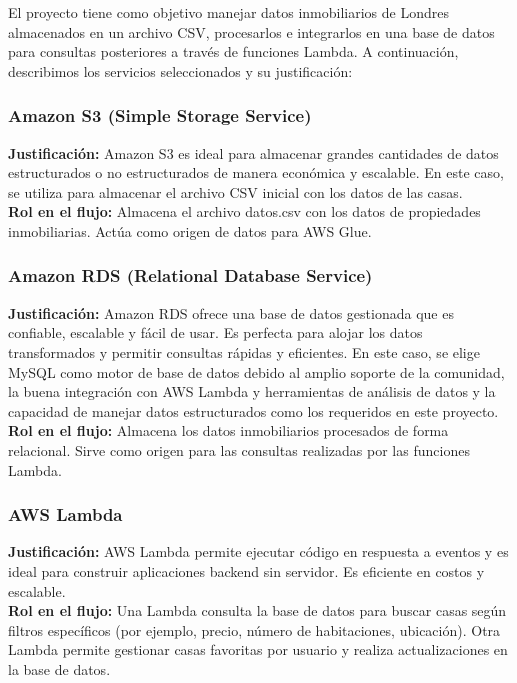 \documentclass{article}
\begin{document}
El proyecto tiene como objetivo manejar datos inmobiliarios de Londres almacenados en un archivo CSV, procesarlos e integrarlos en una base de datos para consultas posteriores a través de funciones Lambda. A continuación, describimos los servicios seleccionados y su justificación:

\subsubsection{Amazon S3 (Simple Storage Service)}
\textbf{Justificación:}
Amazon S3 es ideal para almacenar grandes cantidades de datos estructurados o no estructurados de manera económica y escalable. En este caso, se utiliza para almacenar el archivo CSV inicial con los datos de las casas.\\
\textbf{Rol en el flujo:}
Almacena el archivo datos.csv con los datos de propiedades inmobiliarias.
Actúa como origen de datos para AWS Glue.

\subsubsection{Amazon RDS (Relational Database Service)}
\textbf{Justificación:}
Amazon RDS ofrece una base de datos gestionada que es confiable, escalable y fácil de usar. Es perfecta para alojar los datos transformados y permitir consultas rápidas y eficientes. En este caso, se elige MySQL como motor de base de datos debido al amplio soporte de la comunidad, la buena integración con AWS Lambda y herramientas de análisis de datos y la capacidad de manejar datos estructurados como los requeridos en este proyecto.\\
\textbf{Rol en el flujo:}
Almacena los datos inmobiliarios procesados de forma relacional.
Sirve como origen para las consultas realizadas por las funciones Lambda.


\subsubsection{AWS Lambda}
\textbf{Justificación:}
AWS Lambda permite ejecutar código en respuesta a eventos y es ideal para construir aplicaciones backend sin servidor. Es eficiente en costos y escalable.\\
\textbf{Rol en el flujo:}
Una Lambda consulta la base de datos para buscar casas según filtros específicos (por ejemplo, precio, número de habitaciones, ubicación).
Otra Lambda permite gestionar casas favoritas por usuario y realiza actualizaciones en la base de datos.
\end{document}
